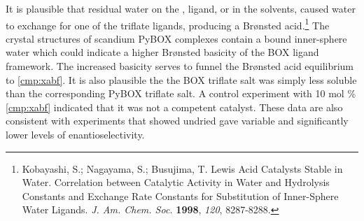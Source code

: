 It is plausible that residual water on the
, ligand, or in the solvents, caused water to exchange for one of the triflate ligands,
producing a Br{\o}nsted acid.\footnote{{\frenchspacing Kobayashi, S.; Nagayama, S.; Busujima, T.
Lewis Acid Catalysts Stable in Water. Correlation between Catalytic Activity in Water and Hydrolysis Constants and Exchange Rate
Constants for Substitution of Inner-Sphere Water Ligands. \textit{J. Am. Chem. Soc.} \textbf{1998},
\textit{120}, 8287-8288.}} The crystal structures of scandium PyBOX complexes contain a bound
inner-sphere water which could indicate a higher Br\o nsted basicity of the BOX ligand framework.
The increased basicity serves to funnel the Br{\o}nsted acid equilibrium to \ref{cmp:xabf}. It is
also plausible the the BOX triflate salt was simply less soluble than the corresponding PyBOX triflate salt. A control
experiment with 10 mol \% \ref{cmp:xabf} indicated that it was not a competent catalyst. These data are also consistent with experiments that showed undried  gave variable and significantly lower levels of
enantioselectivity.


